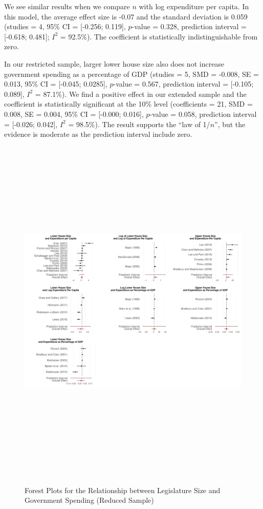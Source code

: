 \documentclass[a4paper,12pt]{article}
\begin{document}
We see similar results when we compare $n$ with log expenditure per capita. In
this model, the average effect size is -0.07 and the standard deviation is
0.059 (studies = 4, 95\% CI = [-0.256; 0.119], $p$-value = 0.328, prediction
interval = [-0.618; 0.481]; $I^2$ = 92.5\%). The coefficient is 
statistically indistinguishable from zero.

In our restricted sample, larger lower house size also does not increase
government spending as a percentage of GDP (studies = 5, SMD = -0.008, SE =
0.013, 95\% CI = [-0.045; 0.0285], $p$-value = 0.567, prediction interval =
[-0.105; 0.089], $I^2$ = 87.1\%). We find a positive effect in our extended
sample and the coefficient is statistically significant at the 10\% level
(coefficients = 21, SMD = 0.008, SE = 0.004, 95\% CI = [-0.000; 0.016], $p$-value =
0.058, prediction interval = [-0.026; 0.042], $I^2$ = 98.5\%). The 
result supports the ``law of 1/$n$'', but the evidence is moderate
as the prediction interval include zero.

\begin{landscape}
\begin{figure}[p]
\begin{center}
\caption{Forest Plots for the Relationship between Legislature Size and Government Spending (Reduced Sample)}
\vspace{.3cm}
\includegraphics[width=25cm,height=17cm]{meta-analysis.pdf}
\label{fig:plots}
\end{center}
\end{figure}
\end{landscape}
\end{document}
